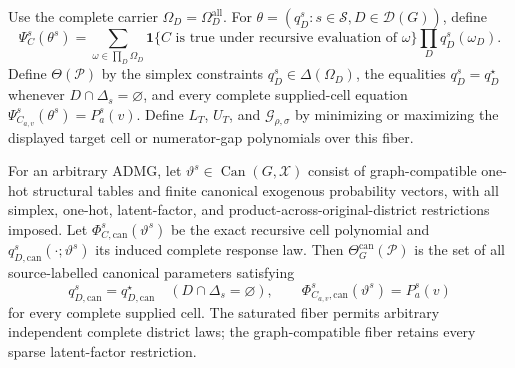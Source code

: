Use the complete carrier \(\Omega_D=\Omega_D^{\mathrm{all}}\).  For \(\theta=(q_D^s:s\in\mathcal S,D\in\mathcal D(G))\), define
\[
\Psi_C^s(\theta^s)=
\sum_{\omega\in\prod_D\Omega_D}
\mathbf1\{C\text{ is true under recursive evaluation of }\omega\}
\prod_Dq_D^s(\omega_D).
\]
Define \(\Theta(\mathcal P)\) by the simplex constraints \(q_D^s\in\Delta(\Omega_D)\), the equalities \(q_D^s=q_D^\star\) whenever \(D\cap\Delta_s=\varnothing\), and every complete supplied-cell equation \(\Psi_{C_{a,v}}^s(\theta^s)=P_a^s(v)\).  Define \(L_T\), \(U_T\), and \(\mathcal G_{\rho,\sigma}\) by minimizing or maximizing the displayed target cell or numerator-gap polynomials over this fiber.

For an arbitrary ADMG, let \(\vartheta^s\in\operatorname{Can}(G,\mathcal X)\) consist of graph-compatible one-hot structural tables and finite canonical exogenous probability vectors, with all simplex, one-hot, latent-factor, and product-across-original-district restrictions imposed.  Let \(\Phi_{C,\mathrm{can}}^s(\vartheta^s)\) be the exact recursive cell polynomial and \(q_{D,\mathrm{can}}^s(\cdot;\vartheta^s)\) its induced complete response law.  Then \(\Theta_G^{\mathrm{can}}(\mathcal P)\) is the set of all source-labelled canonical parameters satisfying
\[
q_{D,\mathrm{can}}^s=q_{D,\mathrm{can}}^\star
\quad(D\cap\Delta_s=\varnothing),\qquad
\Phi_{C_{a,v},\mathrm{can}}^s(\vartheta^s)=P_a^s(v)
\]
for every complete supplied cell.  The saturated fiber permits arbitrary independent complete district laws; the graph-compatible fiber retains every sparse latent-factor restriction.